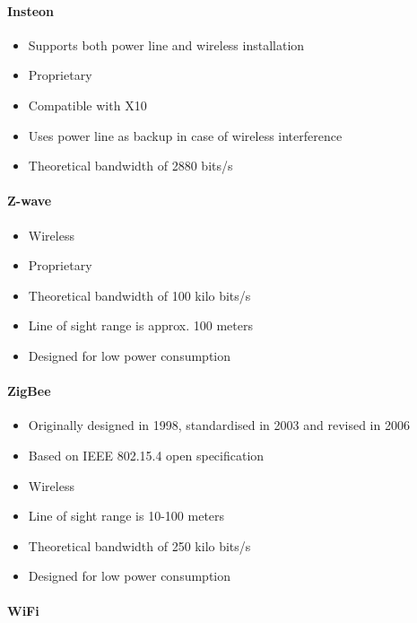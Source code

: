 \paragraph{Insteon} \cite{wiki_insteon}

\begin{itemize}
\item Supports both power line and wireless installation
\item Proprietary
\item Compatible with X10
\item Uses power line as backup in case of wireless interference
\item Theoretical bandwidth of 2880 bits/s
\end{itemize}


\paragraph{Z-wave} \cite{wiki_zwave}

\begin{itemize}
\item Wireless
\item Proprietary
\item Theoretical bandwidth of 100 kilo bits/s
\item Line of sight range is approx. 100 meters
\item Designed for low power consumption
\end{itemize}


\paragraph{ZigBee} \cite{wiki_zigbee}

\begin{itemize}
\item Originally designed in 1998, standardised in 2003 and revised in 2006
\item Based on IEEE 802.15.4 open specification
\item Wireless
\item Line of sight range is 10-100 meters
\item Theoretical bandwidth of 250 kilo bits/s
\item Designed for low power consumption
\end{itemize}

\paragraph{WiFi} \cite{wiki_wifi}

